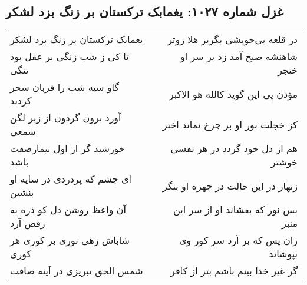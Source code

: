\begin{center}
\section*{غزل شماره ۱۰۲۷: یغمابک ترکستان بر زنگ بزد لشکر}
\label{sec:1027}
\begin{longtable}{l p{0.5cm} r}
یغمابک ترکستان بر زنگ بزد لشکر
&&
در قلعه بی‌خویشی بگریز هلا زوتر
\\
تا کی ز شب زنگی بر عقل بود تنگی
&&
شاهنشه صبح آمد زد بر سر او خنجر
\\
گاو سیه شب را قربان سحر کردند
&&
مؤذن پی این گوید کالله هو الاکبر
\\
آورد برون گردون از زیر لگن شمعی
&&
کز خجلت نور او بر چرخ نماند اختر
\\
خورشید گر از اول بیمارصفت باشد
&&
هم از دل خود گردد در هر نفسی خوشتر
\\
ای چشم که پردردی در سایه او بنشین
&&
زنهار در این حالت در چهره او بنگر
\\
آن واعظ روشن دل کو ذره به رقص آرد
&&
بس نور که بفشاند او از سر این منبر
\\
شاباش زهی نوری بر کوری هر کوری
&&
زان پس که بر آرد سر کور وی نپوشاند
\\
شمس الحق تبریزی در آینه صافت
&&
گر غیر خدا بینم باشم بتر از کافر
\\
\end{longtable}
\end{center}
